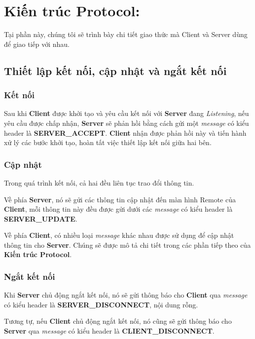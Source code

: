 \section{Kiến trúc Protocol: }

Tại phần này, chúng tôi sẽ trình bày chi tiết giao thức mà Client và Server dùng để giao tiếp với nhau. 

\subsection{Thiết lập kết nối, cập nhật và ngắt kết nối}

\subsubsection{Kết nối}

Sau khi \textbf{Client} được khởi tạo và yêu cầu kết nối với \textbf{Server} đang \textit{Listening}, nếu yêu cầu được chấp nhận, \textbf{Server} sẽ phản hồi bằng cách gửi một \textit{message} có kiểu header là \textbf{SERVER\_ACCEPT}. \textbf{Client} nhận được phản hồi này và tiến hành xử lý các bước khởi tạo, hoàn tất việc thiết lập kết nối giữa hai bên.

\subsubsection{Cập nhật} 

Trong quá trình kết nối, cả hai đều liên tục trao đổi thông tin. 

Về phía \textbf{Server}, nó sẽ gửi các thông tin cập nhật đến màn hình Remote của \textbf{Client}, mỗi thông tin này đều được gửi dưới các \textit{message} có kiểu header là \textbf{SERVER\_UPDATE}.

Về phía \textbf{Client}, có nhiều loại \textit{message} khác nhau được sử dụng để cập nhật thông tin cho \textbf{Server}. Chúng sẽ được mô tả chi tiết trong các phần tiếp theo của \textbf{Kiến trúc Protocol}.

\subsubsection{Ngắt kết nối} 

Khi \textbf{Server} chủ động ngắt kết nối, nó sẽ gửi thông báo cho \textbf{Client} qua \textit{message} có kiểu header là \textbf{SERVER\_DISCONNECT}, nội dung rỗng.

Tương tự, nếu \textbf{Client} chủ động ngắt kết nối, nó cũng sẽ gửi thông báo cho \textbf{Server} qua \textit{message} có kiểu header là \textbf{CLIENT\_DISCONNECT}.


